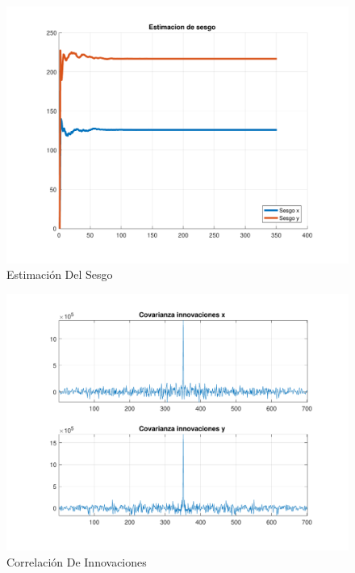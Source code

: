 	\begin{figure}[H]
		\centering
		\includegraphics[width=1.0\textwidth,keepaspectratio]{Figuras/bias_ej4b.pdf}
		\caption{Estimación Del Sesgo}
		\label{fig:ej4b_bias}
	\end{figure}
	
	\begin{figure}[H]
		\centering
		\includegraphics[width=1.0\textwidth,keepaspectratio]{Figuras/covinn_ej4b.pdf}
		\caption{Correlación De Innovaciones}
		\label{fig:ej4b_cov}
	\end{figure}
	
	
